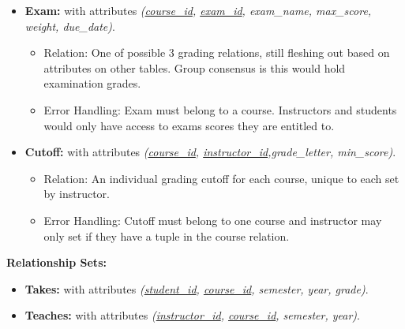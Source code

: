 \documentclass[12pt]{article}
\begin{document}
\begin{itemize}
    \item \textbf{Exam:} with attributes \textit{(\underline{course\_id}, \underline{exam\_id}, exam\_name, max\_score, weight, due\_date)}.
    \begin{itemize}
        \item Relation: One of possible 3 grading relations, still fleshing out based on attributes on other tables. Group consensus is this would hold examination grades. 
        \item Error Handling: Exam must belong to a course. Instructors and students would only have access to exams scores they are entitled to. 
    \end{itemize} 
    
    \item \textbf{Cutoff:} with attributes \textit{(\underline{course\_id}, \underline{instructor\_id},grade\_letter, min\_score)}.
        \begin{itemize}
        \item Relation: An individual grading cutoff for each course, unique to each set by instructor. 
        \item Error Handling: Cutoff must belong to one course and instructor may only set if they have a tuple in the course relation.  
    \end{itemize} 
    
\end{itemize}
\textbf{Relationship Sets:}
\begin{itemize}  
    \item \textbf{Takes:} with attributes \textit{(\underline{student\_id}, \underline{course\_id}, semester, year, grade)}.
    \item \textbf{Teaches:} with attributes \textit{(\underline{instructor\_id}, \underline{course\_id}, semester, year)}.
\end{itemize}
\end{document}
